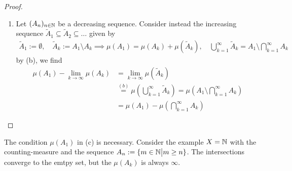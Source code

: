 \begin{proof}
\begin{enumerate}
    \item Let $(A_n)_{n \in \mathbb{N}}$ be a decreasing sequence. 
      Consider instead the increasing sequence $\tilde{A}_1 \subseteq \tilde{A}_2 \subseteq \ldots$ given by
      \begin{align*}
        \tilde{A}_1 := \emptyset, \quad \tilde{A}_k := A_1 \setminus A_k \implies \mu(A_1) = \mu(A_k) + \mu(\tilde{A}_k), \quad \bigcup_{k=1}^{\infty} \tilde{A}_k = A_1 \setminus \bigcap_{k=1}^{\infty}A_k
      \end{align*}
      by (b), we find
      \begin{align*}
        \mu(A_1)  - \lim_{k \to \infty} \mu(A_k)
        &=
        \lim_{k \to \infty} \mu(\tilde{A}_k)\\
        &\stackrel{(b)}{=} \mu \left(
          \bigcup_{k=1}^{\infty} \tilde{A}_k
        \right)
        =
        \mu\left(
          A_1 \setminus \bigcap_{k=1}^{\infty} A_k
        \right)
        \\
        &=
        \mu(A_1) - \mu \left(
          \bigcap_{k=1}^{\infty}A_k
        \right)
      \end{align*}
  \end{enumerate}
\end{proof}

The condition $\mu(A_1)$ in (c) is necessary. 
Consider the example $X = \mathbb{N}$ with the counting-measure and the sequence $A_n := \{m \in \mathbb{N} \big\vert m \geq n\}$.
The intersections converge to the emtpy set, but the $\mu(A_k)$ is always $\infty$.

